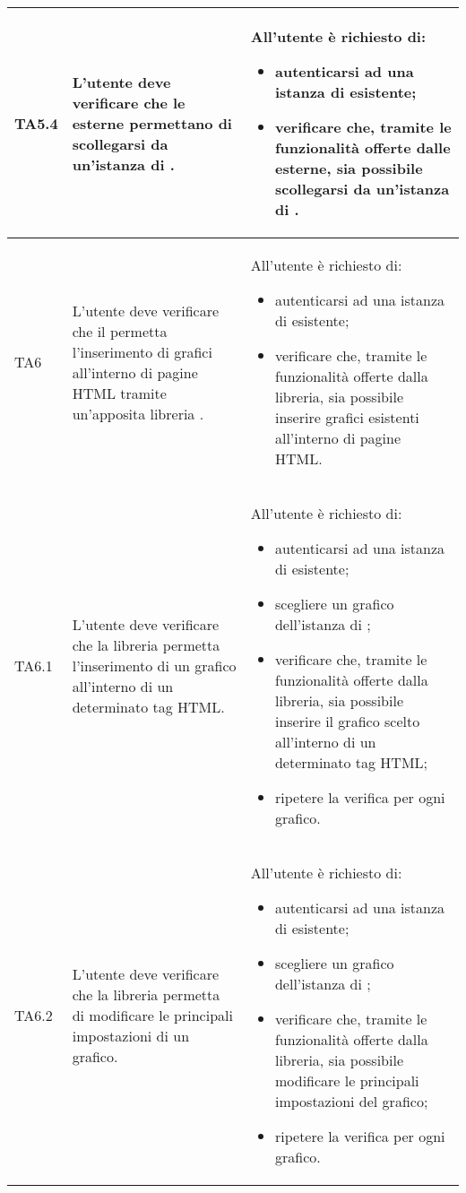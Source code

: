 \begin{longtabu}{| X[0.5] | X | X |}
	TA5.4 & L'utente  deve verificare che le  esterne permettano di scollegarsi  da un'istanza di \projectname{}.
		
		& All'utente  è richiesto di:
		\begin{itemize}
			\item autenticarsi ad una istanza di \projectname{} esistente;
			\item verificare che, tramite le funzionalità offerte dalle  esterne, sia possibile scollegarsi da un'istanza di \projectname{}.
		\end{itemize}
\\ \hline

	TA6 & L'utente  deve verificare che il  permetta l'inserimento di grafici all'interno di pagine HTML tramite un'apposita libreria .
		
		& All'utente  è richiesto di:
		\begin{itemize}
			\item autenticarsi ad una istanza di \projectname{} esistente;
			\item verificare che, tramite le funzionalità offerte dalla libreria, sia possibile inserire grafici esistenti all'interno di pagine HTML.
		\end{itemize}
\\ \hline

	TA6.1 & L'utente  deve verificare che la libreria permetta l'inserimento di un grafico all'interno di un determinato tag HTML.
		
		& All'utente  è richiesto di:
		\begin{itemize}
			\item autenticarsi ad una istanza di \projectname{} esistente;
			\item scegliere un grafico dell'istanza di \projectname{};
			\item verificare che, tramite le funzionalità offerte dalla libreria, sia possibile inserire il grafico scelto all'interno di un determinato tag HTML;
			\item ripetere la verifica per ogni grafico.
		\end{itemize}
\\ \hline

	TA6.2 & L'utente  deve verificare che la libreria permetta di modificare le principali impostazioni di un grafico.
		
		& All'utente  è richiesto di:
		\begin{itemize}
			\item autenticarsi ad una istanza di \projectname{} esistente;
			\item scegliere un grafico dell'istanza di \projectname{};
			\item verificare che, tramite le funzionalità offerte dalla libreria, sia possibile modificare le principali impostazioni del grafico;
			\item ripetere la verifica per ogni grafico.
		\end{itemize}
\\ \hline


\end{longtabu}
